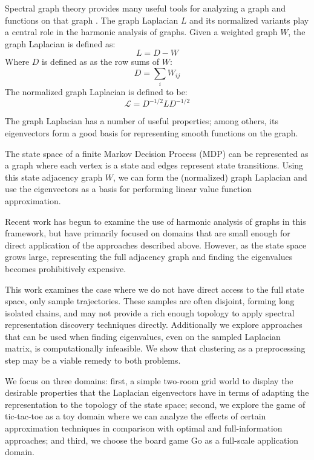 Spectral graph theory provides many useful tools for analyzing a graph and
functions on that graph \citep{Chung1997Spectral}. The graph Laplacian $L$ and
its normalized variants play a central role in the harmonic analysis of graphs.
Given a weighted graph $W$, the graph Laplacian is defined as:
%
\begin{equation}
L = D-W
\end{equation}
%
Where $D$ is defined as as the row sums of $W$:
%
\begin{equation}
D = \sum_{i} W_{ij}
\end{equation}
%
The normalized graph Laplacian is defined to be:
%
\begin{equation}
\mathcal{L} = D^{-1/2}LD^{-1/2}
\label{eqn:norm.laplacian}
\end{equation}

The graph Laplacian has a number of useful properties; among others, its
eigenvectors form a good basis for representing smooth functions on the graph.

The state space of a finite Markov Decision Process (MDP) can be represented
as a graph where each vertex is a state and edges represent state transitions.
Using this state adjacency graph $W$, we can form the (normalized) graph 
Laplacian and use the eigenvectors as a basis for performing linear value 
function approximation.

Recent work \citep{Wang2009Multiscale,Mahadevan2006Value,Coifman06Diffusion} has 
begun to examine the use of harmonic analysis of graphs in this framework, but 
have primarily focused on domains that are small enough for direct application 
of the approaches described above. However, as the state space grows large, 
representing the full adjacency graph and finding the eigenvalues becomes 
prohibitively expensive. 

This work examines the case where we do not have direct access to the full state
space, only sample trajectories. These samples are often disjoint, forming long
isolated chains, and may not provide a rich enough topology to apply spectral 
representation discovery techniques directly. Additionally we explore approaches
that can be used when finding eigenvalues, even on the sampled Laplacian matrix,
is computationally infeasible. We show that clustering as a preprocessing step
may be a viable remedy to both problems.

We focus on three domains: first, a simple two-room grid world to display the 
desirable properties that the Laplacian eigenvectors have in terms of adapting 
the representation to the topology of the state space; second, we explore the 
game of tic-tac-toe as a toy domain where we can analyze the effects of certain
approximation techniques in comparison with optimal and full-information 
approaches; and third, we choose the board game Go as a full-scale application
domain.

